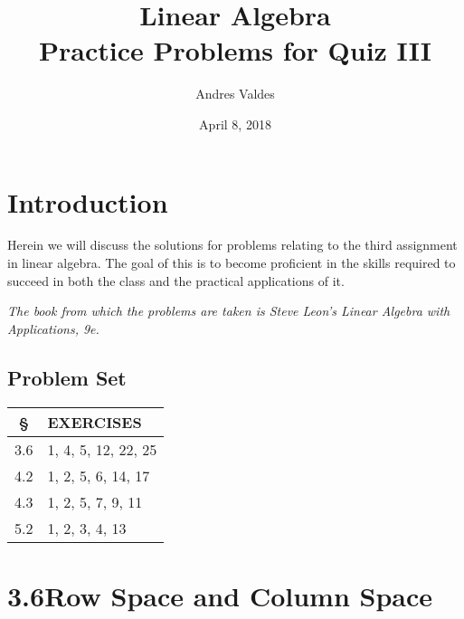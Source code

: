 \documentclass[12pt, letterpaper]{article}
\title{Linear Algebra \\
        \large Practice Problems for Quiz III}
\author{Andres Valdes}
\date{April 8, 2018}
\theoremstyle{remark}
\theoremstyle{remark}
\begin{document}
\begin{titlepage}

	\maketitle

\end{titlepage}

\section*{Introduction}

Herein we will discuss the solutions for problems
relating to the third assignment in linear algebra. The
goal of this is to become proficient in the skills required
to succeed in both the class and the practical applications
of it.

\bigskip
\noindent
\textit{\small *The book from which the problems are taken is
	Steve Leon's Linear Algebra with Applications, 9e.}

\begin{center}

	\section*{Problem Set}

	\begin{tabular}{|c|l|}

		\hline
		§   & \textbf{EXERCISES}  \\
		\hline\hline
		3.6 & 1, 4, 5, 12, 22, 25 \\
		\hline
		4.2 & 1, 2, 5, 6, 14, 17  \\
		\hline
		4.3 & 1, 2, 5, 7, 9, 11   \\
		\hline
		5.2 & 1, 2, 3, 4, 13      \\
		\hline
	\end{tabular}

\end{center}

\pagebreak

\section*{3.6\quad{}Row Space and Column Space}
\end{document}
